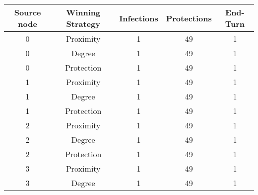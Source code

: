 \documentclass[results.tex]{subfiles}
\begin{document}
    \begin{center}
        \begin{tabular}{| c || c | c | c | c |}
            \hline
            {\bfseries Source node} & {\bfseries Winning Strategy} & {\bfseries Infections} & {\bfseries Protections}
            & {\bfseries End-Turn}
            \\  %
            \hline\hline
            0                       & Proximity                    & 1                      & 49                      & 1                    \\
            \hline
            0                       & Degree                       & 1                      & 49                      & 1                    \\
            \hline
            0                       & Protection                   & 1                      & 49                      & 1                    \\
            \hline
            1                       & Proximity                    & 1                      & 49                      & 1                    \\
            \hline
            1                       & Degree                       & 1                      & 49                      & 1                    \\
            \hline
            1                       & Protection                   & 1                      & 49                      & 1                    \\
            \hline
            2                       & Proximity                    & 1                      & 49                      & 1                    \\
            \hline
            2                       & Degree                       & 1                      & 49                      & 1                    \\
            \hline
            2                       & Protection                   & 1                      & 49                      & 1                    \\
            \hline
            3                       & Proximity                    & 1                      & 49                      & 1                    \\
            \hline
            3                       & Degree                       & 1                      & 49                      & 1                    \\

\end{tabular}
\end{center}
\end{document}
